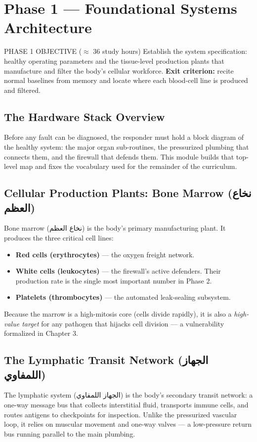 \documentclass[12pt,oneside]{book}
\newcommand{\ar}[1]{\textarabic{#1}}
\begin{document}
\chapter{Phase 1 --- Foundational Systems Architecture}

\begin{kumbox}{PHASE 1 OBJECTIVE \quad ($\approx$ 36 study hours)}
Establish the system specification: healthy operating parameters and the
tissue-level production plants that manufacture and filter the body's
cellular workforce. \textbf{Exit criterion:} recite normal baselines from
memory and locate where each blood-cell line is produced and filtered.
\end{kumbox}

\section{The Hardware Stack Overview}
Before any fault can be diagnosed, the responder must hold a block diagram
of the healthy system: the major organ sub-routines, the pressurized
plumbing that connects them, and the firewall that defends them. This
module builds that top-level map and fixes the vocabulary used for the
remainder of the curriculum.

\section{Cellular Production Plants: Bone Marrow \texorpdfstring{(\ar{نخاع العظم})}{}}
Bone marrow (\ar{نخاع العظم}) is the body's primary manufacturing plant.
It produces the three critical cell lines:
\begin{itemize}[leftmargin=2em]
  \item \textbf{Red cells (erythrocytes)} --- the oxygen freight network.
  \item \textbf{White cells (leukocytes)} --- the firewall's active
        defenders. Their production rate is the single most important
        number in Phase 2.
  \item \textbf{Platelets (thrombocytes)} --- the automated leak-sealing
        subsystem.
\end{itemize}
Because the marrow is a high-mitosis core (cells divide rapidly), it is
also a \emph{high-value target} for any pathogen that hijacks cell
division --- a vulnerability formalized in Chapter 3.

\section{The Lymphatic Transit Network \texorpdfstring{(\ar{الجهاز اللمفاوي})}{}}
The lymphatic system (\ar{الجهاز اللمفاوي}) is the body's secondary
transit network: a one-way message bus that collects interstitial fluid,
transports immune cells, and routes antigens to checkpoints for
inspection. Unlike the pressurized vascular loop, it relies on muscular
movement and one-way valves --- a low-pressure return bus running parallel
to the main plumbing.
\end{document}
